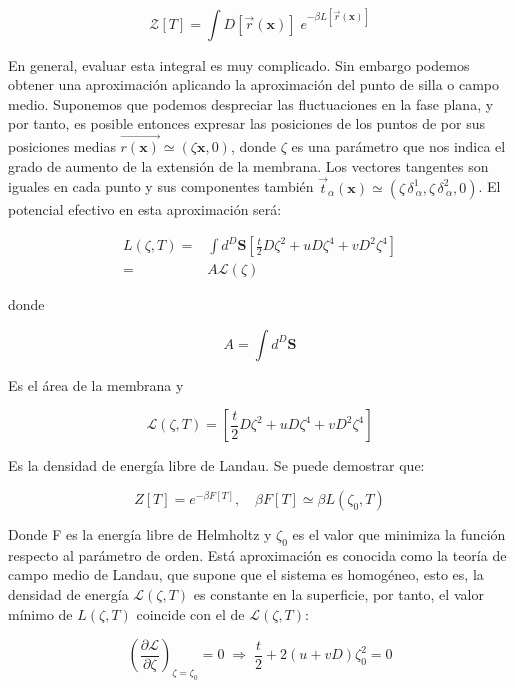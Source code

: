 \begin{equation}
\mathcal{Z}[T]=\int D[\vec{r}(\mathbf{x})]\; e^{-\beta L[\vec{r}(\mathbf{x})]}
\end{equation}

En general, evaluar esta integral es muy complicado. Sin embargo podemos
obtener una aproximación aplicando la aproximación del punto de silla o campo
medio. Suponemos que podemos despreciar las fluctuaciones en la fase plana, y
por tanto, es posible entonces expresar las posiciones de los puntos de por
sus posiciones medias $\vec{r(\mathbf{x})} \simeq (\zeta \mathbf{x},0)$, donde
$\zeta$ es una parámetro que nos indica el grado de aumento de la extensión de
la membrana. Los vectores tangentes son iguales en cada punto y sus
componentes también $\vec{t}_{\alpha}(\mathbf{x})\simeq (\zeta \, \delta^1_{\
  \alpha},\zeta\,  \delta^2_{\ \alpha},0)$. El potencial efectivo en esta
aproximación será:

\begin{align}
  L(\zeta,T)=&\int d^D \mathbf{S} \left[ \frac{t}{2} D\zeta^2 + uD\zeta^4+vD^2\zeta^4\right]\\
  =&A\mathcal{L}(\zeta)
\end{align}

donde 

$$A=\int d^D \mathbf{S}$$

Es el área de la membrana y 

\begin{equation}
\mathcal{L}(\zeta,T)=\left[ \frac{t}{2} D\zeta^2 + uD\zeta^4+vD^2\zeta^4\right]
\end{equation}

Es la densidad de energía libre de Landau. Se puede demostrar que:

\begin{equation}
Z[T]= e^{-\beta F[T]}, \quad \beta F[T]\simeq \beta L(\zeta_0,T)
\end{equation}

Donde F es la energía libre de Helmholtz  y $\zeta_0$ es el valor que minimiza
la función respecto al parámetro de orden. Está aproximación es conocida 
como la teoría de campo medio de Landau, que supone que el sistema es
homogéneo, esto es, la densidad de energía $\mathcal{L}(\zeta,T)$ es constante
en la superficie, por tanto, el valor mínimo de $L(\zeta,T)$ coincide con el de
$\mathcal{L}(\zeta,T)$: 

\begin{equation}
\left(\frac{\partial \mathcal{L}}{\partial \zeta}\right)_{\!\zeta=\zeta_0}\!=0 \; \Rightarrow \; \frac{t}{2}+2(u+vD)\zeta_0^2=0
\end{equation}
 

